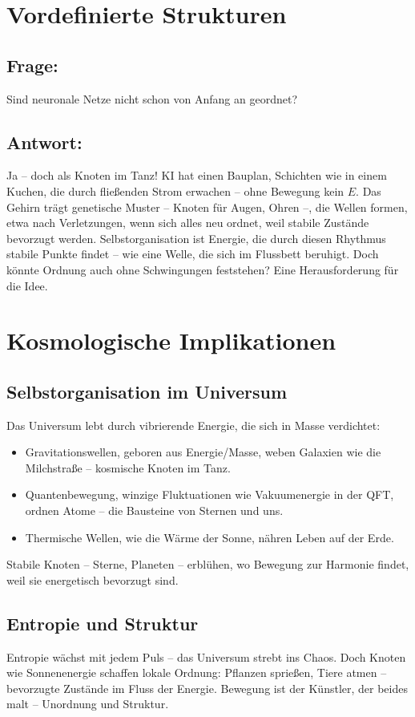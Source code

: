\documentclass{article}
\begin{document}
	\section{Vordefinierte Strukturen}
	
	\subsection*{Frage:}
	Sind neuronale Netze nicht schon von Anfang an geordnet?
	
	\subsection*{Antwort:}
	Ja – doch als Knoten im Tanz! KI hat einen Bauplan, Schichten wie in einem Kuchen, die durch fließenden Strom erwachen – ohne Bewegung kein $E$. Das Gehirn trägt genetische Muster – Knoten für Augen, Ohren –, die Wellen formen, etwa nach Verletzungen, wenn sich alles neu ordnet, weil stabile Zustände bevorzugt werden. Selbstorganisation ist Energie, die durch diesen Rhythmus stabile Punkte findet – wie eine Welle, die sich im Flussbett beruhigt. Doch könnte Ordnung auch ohne Schwingungen feststehen? Eine Herausforderung für die Idee.
	
	\section{Kosmologische Implikationen}
	
	\subsection*{Selbstorganisation im Universum}
	Das Universum lebt durch vibrierende Energie, die sich in Masse verdichtet:
	\begin{itemize}
		\item Gravitationswellen, geboren aus Energie/Masse, weben Galaxien wie die Milchstraße – kosmische Knoten im Tanz.
		\item Quantenbewegung, winzige Fluktuationen wie Vakuumenergie in der QFT, ordnen Atome – die Bausteine von Sternen und uns.
		\item Thermische Wellen, wie die Wärme der Sonne, nähren Leben auf der Erde.
	\end{itemize}
	Stabile Knoten – Sterne, Planeten – erblühen, wo Bewegung zur Harmonie findet, weil sie energetisch bevorzugt sind.
	
	\subsection*{Entropie und Struktur}
	Entropie wächst mit jedem Puls – das Universum strebt ins Chaos. Doch Knoten wie Sonnenenergie schaffen lokale Ordnung: Pflanzen sprießen, Tiere atmen – bevorzugte Zustände im Fluss der Energie. Bewegung ist der Künstler, der beides malt – Unordnung und Struktur.
	
\end{document}
